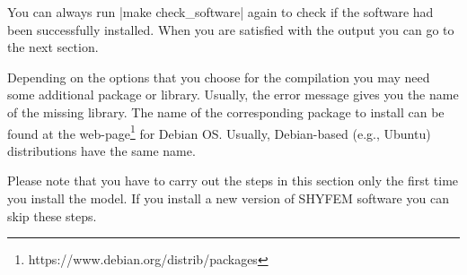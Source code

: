 You can always run |make check_software| again to check if the software
had been successfully installed. When you are satisfied with the output
you can go to the next section.

Depending on the options that you choose for the compilation you may
need some additional package or library. Usually, the error message
gives you the name of the missing library. The name of the corresponding
package to install can be found at the 
web-page\footnote{https://www.debian.org/distrib/packages} for Debian OS.
Usually, Debian-based (e.g., Ubuntu) distributions have the same name.

Please note that you have to carry out the steps in this section only
the first time you install the model. If you install a new version of
SHYFEM software you can skip these steps.


